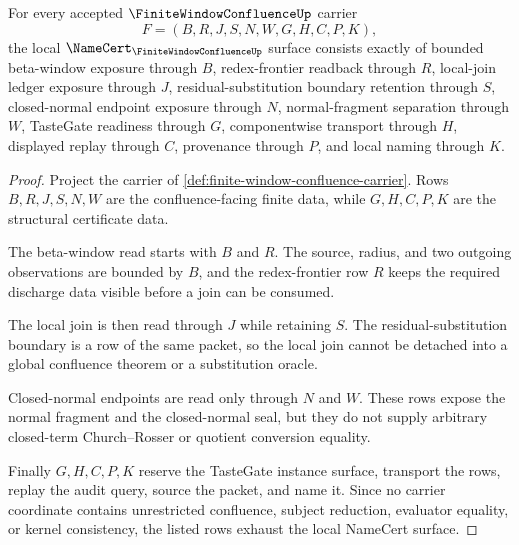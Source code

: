 \begin{theorem}
\label{thm:finite-window-confluence-namecert-obligations}
For every accepted $\FiniteWindowConfluenceUp$ carrier
$$
F=(B,R,J,S,N,W,G,H,C,P,K),
$$
the local $\NameCert_{\FiniteWindowConfluenceUp}$ surface consists exactly of bounded beta-window exposure through $B$, redex-frontier readback through $R$, local-join ledger exposure through $J$, residual-substitution boundary retention through $S$, closed-normal endpoint exposure through $N$, normal-fragment separation through $W$, TasteGate readiness through $G$, componentwise transport through $H$, displayed replay through $C$, provenance through $P$, and local naming through $K$.
\end{theorem}
\begin{proof}
Project the carrier of \autoref{def:finite-window-confluence-carrier}. Rows $B,R,J,S,N,W$ are the confluence-facing finite data, while $G,H,C,P,K$ are the structural certificate data.

The beta-window read starts with $B$ and $R$. The source, radius, and two outgoing observations are bounded by $B$, and the redex-frontier row $R$ keeps the required discharge data visible before a join can be consumed.

The local join is then read through $J$ while retaining $S$. The residual-substitution boundary is a row of the same packet, so the local join cannot be detached into a global confluence theorem or a substitution oracle.

Closed-normal endpoints are read only through $N$ and $W$. These rows expose the normal fragment and the closed-normal seal, but they do not supply arbitrary closed-term Church--Rosser or quotient conversion equality.

Finally $G,H,C,P,K$ reserve the TasteGate instance surface, transport the rows, replay the audit query, source the packet, and name it. Since no carrier coordinate contains unrestricted confluence, subject reduction, evaluator equality, or kernel consistency, the listed rows exhaust the local NameCert surface.
\end{proof}


